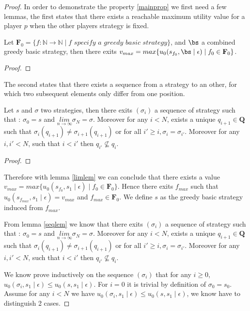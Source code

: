 \begin{proof}

In order to demonstrate the property \ref{mainprop} we first need a few lemmas, the first states that there exists a reachable maximum utility value for a player $p$ when the other players strategy is fixed.
\begin{mylem}
\label{limlem}
Let $\mathbf{F}_0 = \{f : \mathbb{N} \rightarrow \mathbb{N} \mid f \textit{ specify a greedy basic strategy} \}$, and $\bs$ a combined greedy basic strategy,
then there exits $v_{max} = max \{u_0(s_{f_0},\bs \mid \epsilon) \mid f_0 \in \mathbf{F}_0 \}$.
\end{mylem}
\begin{proof}
\end{proof}

The second states that there exists a sequence from a strategy to an other, for which two subsequent elements only differ from one position.

\begin{mylem}
\label{seqlem}
Let $s$ and $\sigma$ two strategies, then
there exits $(\sigma_i)$ a sequence of strategy such that : $\sigma_0 = s$ and $\underset{n\rightarrow \infty}{lim}\sigma_N = \sigma$. Moreover for any $i < N$, exists a unique $q_{i+1} \in \mathbf{Q}$ such that $\sigma_{i}(q_{i+1}) \neq \sigma_{i+1}(q_{i+1})$ or for all $i' \geq i, \sigma_{i} = \sigma_{i'}$. Moreover for any $i,i' < N$, such that $i < i'$ then $q_{i'} \not \subseteq q_{i}$.
\end{mylem}
\begin{proof}
\end{proof}

Therefore with lemma \ref{limlem} we can conclude that there exists a value $v_{max} = max \{u_0(s_{f_0},s_1 \mid \epsilon) \mid f_0 \in \mathbf{F}_0 \}$. Hence there exits $f_{max}$ such that $u_0(s_{f_{max}},s_1\mid \epsilon) = v_{max}$ and $f_{max} \in \mathbf{F}_0$. We define $s$ as the greedy basic strategy induced from $f_{max}$.

From lemma \ref{seqlem} we know that there exits $(\sigma_i)$ a sequence of strategy such that : $\sigma_0 = s$ and $\underset{n\rightarrow \infty}{lim}\sigma_N = \sigma$. Moreover for any $i < N$, exists a unique $q_{i+1} \in \mathbf{Q}$ such that $\sigma_{i}(q_{i+1}) \neq \sigma_{i+1}(q_{i+1})$ or for all $i' \geq i, \sigma_{i} = \sigma_{i'}$. Moreover for any $i,i' < N$, such that $i < i'$ then $q_{i'} \not \subseteq q_{i}$.


We know prove inductively on the sequence $(\sigma_i)$ that for any $i \geq 0$, $u_0(\sigma_i,s_1 \mid \epsilon) \leq u_0(s,s_1 \mid \epsilon)$. For $i = 0$ it is trivial by definition of $\sigma_0 = s_0$.
Assume for any $i < N$ we have $u_0(\sigma_i,s_1 \mid \epsilon) \leq u_0(s,s_1 \mid \epsilon)$, we know have to distinguish 2 cases.


\end{proof}
